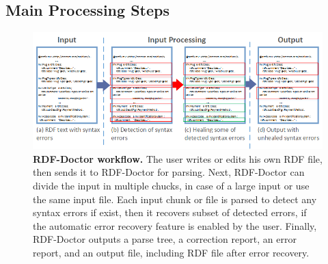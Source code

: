



\subsection{Main Processing Steps}

\begin{figure}
	\centering
	  	\includegraphics[width=1\textwidth]{images/Approach.png}
		\caption{\textbf{RDF-Doctor workflow.} The user writes or edits his own RDF file, then sends it to RDF-Doctor for parsing.
		Next, RDF-Doctor can divide the input in multiple chucks, in case of a large input or use the same input file. 
		Each input chunk or file is parsed to detect any syntax errors if exist, then it recovers subset of detected errors, if the automatic error recovery feature is enabled by the user. 
		Finally, RDF-Doctor outputs a parse tree, a correction report, an error report, and an output file, including RDF file after error recovery.}
		\label{Fig:Approach}  
\end{figure}

